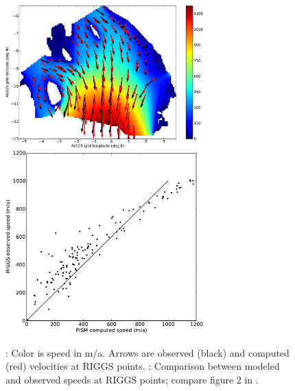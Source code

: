 \documentclass[11pt,final]{amsart}
\begin{document}
\begin{figure}[ht]
\mbox{\includegraphics[width=3in,keepaspectratio=true]{rossquiver}\, \includegraphics[width=3in,keepaspectratio=true]{rossscatter}}
\caption{: Color is speed in m/a.  Arrows are observed (black) and computed (red) velocities at RIGGS points.  : Comparison between modeled and observed speeds at RIGGS points; compare figure 2 in \cite{MacAyealetal}.}
\label{fig:rosspython}
\end{figure}



\clearpage\newpage



\appendix

\newcommand{\subsect}[1]{\bigskip\subsection{#1}\rule{0mm}{2mm}\par\medskip}
\newcommand{\subsectstar}[1]{\bigskip\noindent\textbf{#1.}\rule{0mm}{2mm}\par\medskip}
\newcommand{\subsubsect}[1]{\subsubsection{#1}\rule{0mm}{2mm}\par\smallskip}
\end{document}

